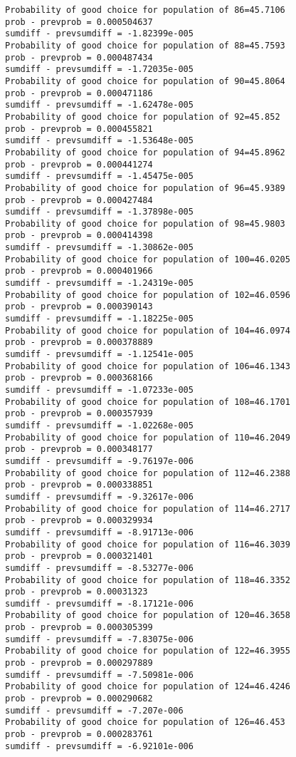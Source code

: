 \documentclass[11pt,onecolumn]{article}
\begin{document}
\begin{verbatim}
Probability of good choice for population of 86=45.7106
prob - prevprob = 0.000504637
sumdiff - prevsumdiff = -1.82399e-005
Probability of good choice for population of 88=45.7593
prob - prevprob = 0.000487434
sumdiff - prevsumdiff = -1.72035e-005
Probability of good choice for population of 90=45.8064
prob - prevprob = 0.000471186
sumdiff - prevsumdiff = -1.62478e-005
Probability of good choice for population of 92=45.852
prob - prevprob = 0.000455821
sumdiff - prevsumdiff = -1.53648e-005
Probability of good choice for population of 94=45.8962
prob - prevprob = 0.000441274
sumdiff - prevsumdiff = -1.45475e-005
Probability of good choice for population of 96=45.9389
prob - prevprob = 0.000427484
sumdiff - prevsumdiff = -1.37898e-005
Probability of good choice for population of 98=45.9803
prob - prevprob = 0.000414398
sumdiff - prevsumdiff = -1.30862e-005
Probability of good choice for population of 100=46.0205
prob - prevprob = 0.000401966
sumdiff - prevsumdiff = -1.24319e-005
Probability of good choice for population of 102=46.0596
prob - prevprob = 0.000390143
sumdiff - prevsumdiff = -1.18225e-005
Probability of good choice for population of 104=46.0974
prob - prevprob = 0.000378889
sumdiff - prevsumdiff = -1.12541e-005
Probability of good choice for population of 106=46.1343
prob - prevprob = 0.000368166
sumdiff - prevsumdiff = -1.07233e-005
Probability of good choice for population of 108=46.1701
prob - prevprob = 0.000357939
sumdiff - prevsumdiff = -1.02268e-005
Probability of good choice for population of 110=46.2049
prob - prevprob = 0.000348177
sumdiff - prevsumdiff = -9.76197e-006
Probability of good choice for population of 112=46.2388
prob - prevprob = 0.000338851
sumdiff - prevsumdiff = -9.32617e-006
Probability of good choice for population of 114=46.2717
prob - prevprob = 0.000329934
sumdiff - prevsumdiff = -8.91713e-006
Probability of good choice for population of 116=46.3039
prob - prevprob = 0.000321401
sumdiff - prevsumdiff = -8.53277e-006
Probability of good choice for population of 118=46.3352
prob - prevprob = 0.00031323
sumdiff - prevsumdiff = -8.17121e-006
Probability of good choice for population of 120=46.3658
prob - prevprob = 0.000305399
sumdiff - prevsumdiff = -7.83075e-006
Probability of good choice for population of 122=46.3955
prob - prevprob = 0.000297889
sumdiff - prevsumdiff = -7.50981e-006
Probability of good choice for population of 124=46.4246
prob - prevprob = 0.000290682
sumdiff - prevsumdiff = -7.207e-006
Probability of good choice for population of 126=46.453
prob - prevprob = 0.000283761
sumdiff - prevsumdiff = -6.92101e-006

\end{verbatim}
\end{document}

